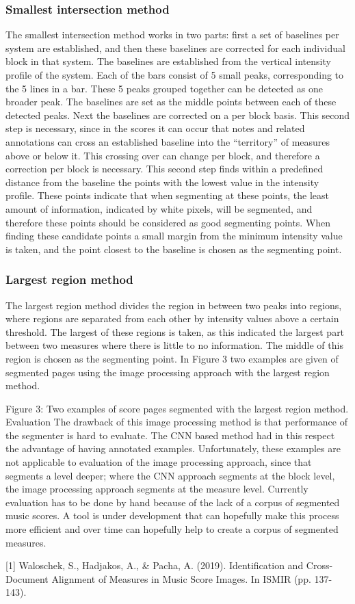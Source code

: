 \subsubsection{Smallest intersection method}
The smallest intersection method works in two parts: first a set of baselines per system are established, and then these baselines are corrected for each individual block in that system. The baselines are established from the vertical intensity profile of the system. Each of the bars consist of 5 small peaks, corresponding to the 5 lines in a bar. These 5 peaks grouped together can be detected as one broader peak. The baselines are set as the middle points between each of these detected peaks. Next the baselines are corrected on a per block basis. This second step is necessary, since in the scores it can occur that notes and related annotations can cross an established baseline into the “territory” of measures above or below it. This crossing over can change per block, and therefore a correction per block is necessary. This second step finds within a predefined distance from the baseline the points with the lowest value in the intensity profile. These points indicate that when segmenting at these points, the least amount of information, indicated by white pixels, will be segmented, and therefore these points should be considered as good segmenting points. When finding these candidate points a small margin from the minimum intensity value is taken, and the point closest to the baseline is chosen as the segmenting point.

\subsubsection{Largest region method}
The largest region method divides the region in between two peaks into regions, where regions are separated from each other by intensity values above a certain threshold. The largest of these regions is taken, as this indicated the largest part between two measures where there is little to no information. The middle of this region is chosen as the segmenting point. In Figure 3 two examples are given of segmented pages using the image processing approach with the largest region method.

Figure 3: Two examples of score pages segmented with the largest region method.    
Evaluation
The drawback of this image processing method is that performance of the segmenter is hard to evaluate. The CNN based method had in this respect the advantage of having annotated examples. Unfortunately, these examples are not applicable to evaluation of the image processing approach, since that segments a level deeper; where the CNN approach segments at the block level, the image processing approach segments at the measure level. Currently evaluation has to be done by hand because of the lack of a corpus of segmented music scores. A tool is under development that can hopefully make this process more efficient and over time can hopefully help to create a corpus of segmented measures.

[1] Waloschek, S., Hadjakos, A., \& Pacha, A. (2019). Identification and Cross-Document Alignment of Measures in Music Score Images. In ISMIR (pp. 137-143).


